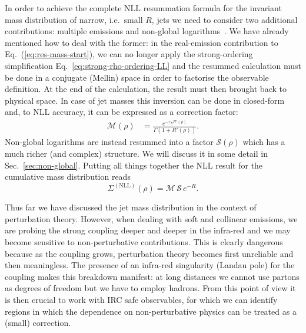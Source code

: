 In order to achieve the complete NLL resummation formula for the
invariant mass distribution of narrow, i.e.\ small $R$, jets we need
to consider two additional contributions: multiple emissions and
non-global logarithms~\cite{Dasgupta:2001sh}. We have already
mentioned how to deal with the former: in the real-emission
contribution to Eq.~(\ref{eq:res-mass-start}), we can no longer apply
the strong-ordering simplification 
Eq.~\eqref{eq:strong-rho-ordering-LL} and the resummed calculation must
be done in a conjugate (Mellin) space in order to factorise the
observable definition. 
%
At the end of the calculation, the result must then brought back to
physical space. In case of jet masses this inversion can be done in
closed-form and, to NLL accuracy, it can be expressed as a correction
factor:
\begin{align}\label{eq:mult-emission-nll}
\mathcal{M}(\rho)&=  \frac{e^{-\gamma_E R'(\rho)}}{\Gamma(1 +R'(\rho))}.
\end{align}
Non-global logarithms are instead resummed into a factor $\mathcal{S}(\rho)$ which has a much richer (and complex) structure. We will discuss it in some detail in Sec.~\ref{sec:non-global}. Putting all things together the NLL result for the cumulative mass distribution reads
\begin{equation}
  \label{eq:Sigma-plain-jet-mass}
  \Sigma^{(\text{NLL})}(\rho) = \mathcal{M} \,\mathcal{S}\, e^{-R} .
\end{equation}

Thus far we have discussed the jet mass distribution in the context of perturbation theory. However, when dealing with soft and collinear emissions, we are probing the strong coupling deeper and deeper in the infra-red and we may become sensitive to non-perturbative contributions. This is clearly dangerous because as the coupling grows, perturbation theory becomes first unreliable and then meaningless. The presence of an infra-red singularity (Landau pole) for the coupling makes this breakdown manifest: at long distances we cannot use partons as degrees of freedom but we have to employ hadrons. 
%
From this point of view it is then crucial to work with IRC safe observables, for which we can identify regions in which the dependence on non-perturbative physics can be treated as a (small) correction.


